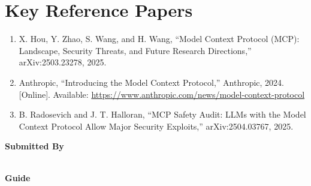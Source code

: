 \documentclass[11pt]{article}
\begin{document}
\section*{Key Reference Papers}
\begin{enumerate}
  \item X. Hou, Y. Zhao, S. Wang, and H. Wang, ``Model Context Protocol (MCP): Landscape, Security Threats, and Future Research Directions,'' arXiv:2503.23278, 2025.
  \item Anthropic, ``Introducing the Model Context Protocol,'' Anthropic, 2024. [Online]. Available: \url{https://www.anthropic.com/news/model-context-protocol}
  \item B. Radosevich and J. T. Halloran, ``MCP Safety Audit: LLMs with the Model Context Protocol Allow Major Security Exploits,'' arXiv:2504.03767, 2025.
\end{enumerate}
\vspace{0.8em}
\noindent\textbf{Submitted By}\\
\seminarName\\
\seminarRoll

\vspace{0.6em}
\noindent\textbf{Guide}\\
\seminarGuide
\end{document}
